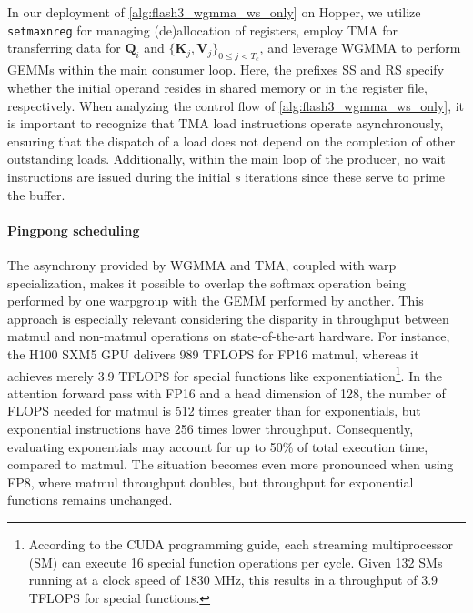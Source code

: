 In our deployment of \cref{alg:flash3_wgmma_ws_only} on Hopper, we utilize \verb|setmaxnreg| for managing (de)allocation of registers, employ TMA for transferring data for $\mathbf{Q}_i$ and $\{ \mathbf{K}_j, \mathbf{V}_j \}_{0 \leq j < T_c}$, and leverage WGMMA to perform GEMMs within the main consumer loop. Here, the prefixes SS and RS specify whether the initial operand resides in shared memory or in the register file, respectively. When analyzing the control flow of \cref{alg:flash3_wgmma_ws_only}, it is important to recognize that TMA load instructions operate asynchronously, ensuring that the dispatch of a load does not depend on the completion of other outstanding loads. Additionally, within the main loop of the producer, no wait instructions are issued during the initial $s$ iterations since these serve to prime the buffer.

\paragraph{Pingpong scheduling} The asynchrony provided by WGMMA and TMA, coupled with warp specialization, makes it possible to overlap the softmax operation being performed by one warpgroup with the GEMM performed by another. This approach is especially relevant considering the disparity in throughput between matmul and non-matmul operations on state-of-the-art hardware. For instance, the H100 SXM5 GPU delivers 989 TFLOPS for FP16 matmul, whereas it achieves merely 3.9 TFLOPS for special functions like exponentiation\footnote{According to the CUDA programming guide, each streaming multiprocessor (SM) can execute 16 special function operations per cycle. Given 132 SMs running at a clock speed of 1830 MHz, this results in a throughput of 3.9 TFLOPS for special functions.}. In the attention forward pass with FP16 and a head dimension of 128, the number of FLOPS needed for matmul is 512 times greater than for exponentials, but exponential instructions have 256 times lower throughput. Consequently, evaluating exponentials may account for up to 50\% of total execution time, compared to matmul. The situation becomes even more pronounced when using FP8, where matmul throughput doubles, but throughput for exponential functions remains unchanged.


